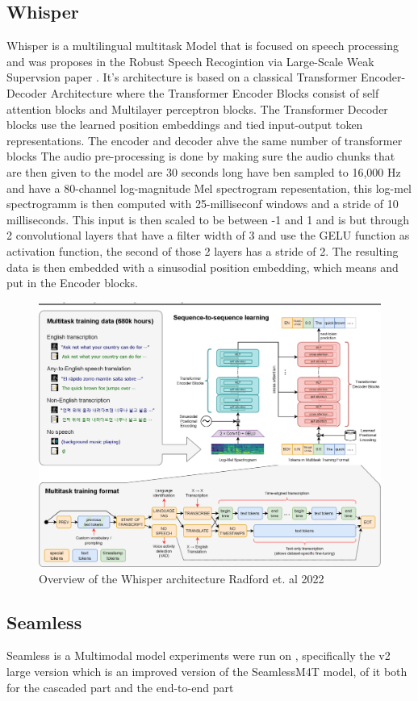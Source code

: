 \subsection{Whisper}
Whisper is a multilingual multitask Model that is focused on speech processing and was proposes in the Robust Speech Recogintion via Large-Scale Weak Supervsion paper \cite{radford2022robust}. 
It's architecture is based on a classical Transformer Encoder-Decoder Architecture where the Transformer Encoder Blocks consist of self attention blocks and Multilayer perceptron blocks. 
The Transformer Decoder blocks use the learned position embeddings and tied input-output token representations. 
The encoder and decoder ahve the same number of transformer blocks 
The audio pre-processing is done by making sure the audio chunks that are then given to the model are 30 seconds long have ben sampled to 16,000 Hz and have a 80-channel log-magnitude Mel spectrogram repesentation, this log-mel spectrogramm is then computed with 25-milliseconf windows and a stride of 10 milliseconds. This input is then scaled to be between -1 and 1 and is but through 2 convolutional layers that have a filter width of 3 and use the GELU function as activation function, the second of those 2 layers has a stride of 2. 
The resulting data is then embedded with a sinusodial position embedding, which means %
and put in the Encoder blocks. 

\begin{figure}
        \centering
        \includegraphics[width=0.5\linewidth]{Latex//sections//images/whispermodel.png}
        \caption{Overview of the Whisper architecture Radford et. al 2022}
        \label{fig:whispermodel}
    \end{figure}

\subsection{Seamless}

Seamless is a Multimodal model 
experiments were run on \cite{seamless2023}, specifically the v2 large version which is an improved version of the SeamlessM4T model, 
of it both for the cascaded part and the end-to-end part

